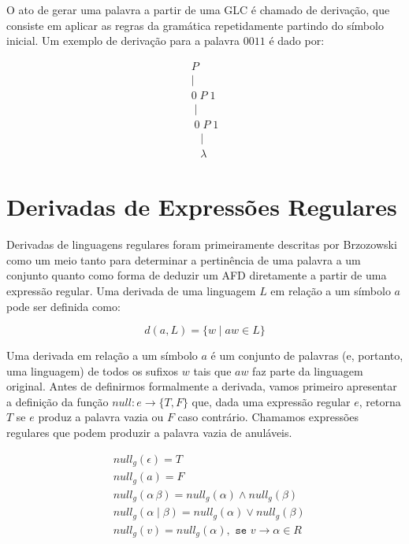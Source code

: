 O ato de gerar uma palavra a partir de uma GLC é chamado de derivação, que consiste em aplicar as regras da gramática repetidamente partindo do símbolo inicial. Um exemplo de derivação para a palavra $0011$ é dado por:

\[
\begin{array}{c}
P \\
| \\
0 \; P \; 1 \\
\; | \\
\; 0 \; P \; 1 \\
\;\;\; | \\
\;\;\; \lambda
\end{array}
\]

\section{Derivadas de Expressões Regulares}

Derivadas de linguagens regulares foram primeiramente descritas por Brzozowski \cite{Brzozowski64} como um meio tanto para determinar a pertinência de uma palavra a um conjunto quanto como forma de deduzir um AFD diretamente a partir de uma expressão regular. Uma derivada de uma linguagem $L$ em relação a um símbolo $a$ pode ser definida como:

\begin{equation}
     d(a,L)  = \{w \mid aw \in L\}
     \label{def:derivate}
\end{equation}

Uma derivada em relação a um símbolo $a$ é um conjunto de palavras (e, portanto, uma linguagem) de todos os sufixos $w$ tais que $aw$ faz parte da linguagem original. Antes de definirmos formalmente a derivada, vamos primeiro apresentar a definição da função $null : e \to \{T,F\}$ que, dada uma expressão regular $e$, retorna $T$ se $e$ produz a palavra vazia ou $F$ caso contrário. Chamamos expressões regulares que podem produzir a palavra vazia de anuláveis.

\begin{align*}
    & null_g(\epsilon)  =  T\\
    & null_g(a)  =  F\\
    & null_g(\alpha \, \beta)  =  null_g(\alpha) \wedge null_g(\beta)\\
    & null_g(\alpha \;|\; \beta)  =  null_g(\alpha) \vee null_g(\beta)\\
    & null_g(v)  =  null_g(\alpha), \texttt{ se } v \to \alpha \in R
\end{align*}

